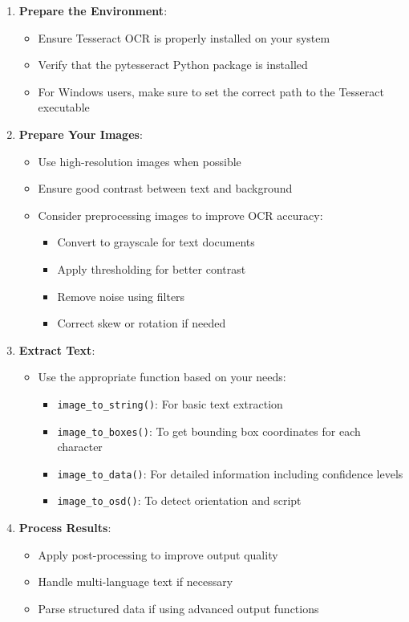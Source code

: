 \documentclass{article}
\begin{document}
	\begin{enumerate}
		\item \textbf{Prepare the Environment}:
		\begin{itemize}
			\item Ensure Tesseract OCR is properly installed on your system
			\item Verify that the pytesseract Python package is installed
			\item For Windows users, make sure to set the correct path to the Tesseract executable
		\end{itemize}
		
		\item \textbf{Prepare Your Images}:
		\begin{itemize}
			\item Use high-resolution images when possible
			\item Ensure good contrast between text and background
			\item Consider preprocessing images to improve OCR accuracy:
			\begin{itemize}
				\item Convert to grayscale for text documents
				\item Apply thresholding for better contrast
				\item Remove noise using filters
				\item Correct skew or rotation if needed
			\end{itemize}
		\end{itemize}
		
		\item \textbf{Extract Text}:
		\begin{itemize}
			\item Use the appropriate function based on your needs:
			\begin{itemize}
				\item \texttt{image\_to\_string()}: For basic text extraction
				\item \texttt{image\_to\_boxes()}: To get bounding box coordinates for each character
				\item \texttt{image\_to\_data()}: For detailed information including confidence levels
				\item \texttt{image\_to\_osd()}: To detect orientation and script
			\end{itemize}
		\end{itemize}
		
		\item \textbf{Process Results}:
		\begin{itemize}
			\item Apply post-processing to improve output quality
			\item Handle multi-language text if necessary
			\item Parse structured data if using advanced output functions \cite {DataCamp:2024, Betterpath:2023, Nutrient:2025}
		\end{itemize}
	\end{enumerate}
	
\end{document}
